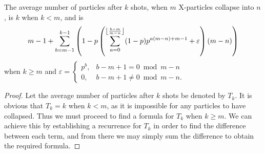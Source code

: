 \begin{theorem}
  The average number of particles after $k$ shots, when $m$ X-particles collapse into $n$, is $k$ when $k < m$, and is 
  \begin{equation}
    m-1+\sum _{b=m-1}^{k-1} \left(1-p \left(\sum _{a=0}^{\floor*{\frac{b-m}{m-n}} } (1-p) p^{a (m-n)+m-1}+\varepsilon\right) (m-n)\right) \label{formula}
  \end{equation}
  when $k \ge m$ and $\varepsilon = \begin{cases} p^{b}, &b-m+1 = 0 \bmod m-n \\ 0, &b-m+1 \neq 0 \bmod m-n. \end{cases}$
\end{theorem}
\begin{proof}
  Let the average number of particles after $k$ shots be denoted by $T_k$. It is obvious that $T_k = k$ when $k < m$, as it is impossible for any particles to have collapsed. Thus we must proceed to find a formula for $T_k$ when $k \ge m$. We can achieve this by establishing a recurrence for $T_k$ in order to find the difference between each term, and from there we may simply sum the difference to obtain the required formula. 


\end{proof}
